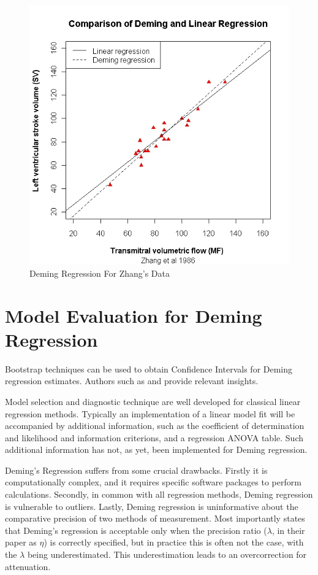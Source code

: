 \documentclass[12pt, a4paper]{report}
\theoremstyle{plain}
\theoremstyle{definition}
\theoremstyle{remark}
\begin{document}
\begin{figure}[h!]
	\includegraphics[width=130mm]{images/ZhangDeming.jpeg}
	\caption{Deming Regression For Zhang's Data}\label{ZhangDeming}
\end{figure}

\section{Model Evaluation for Deming Regression}
Bootstrap techniques can be used to obtain Confidence Intervals for Deming regression estimates. Authors such as 
\citet{carpenter2000bootstrap} and \citet{johnson2001bootstrap} provide relevant insights.




Model selection and diagnostic technique are well developed for classical linear regression methods. Typically an implementation of a linear model fit will be accompanied by additional information, such as the coefficient of determination and likelihood and information criterions, and a regression ANOVA table. Such additional information has not, as yet, been implemented for Deming regression.

Deming's Regression suffers from some crucial drawbacks. Firstly it is computationally complex, and it requires specific software packages to perform calculations. Secondly, in common with all regression methods, Deming regression is vulnerable to outliers. Lastly, Deming regression is uninformative
about the comparative precision of two methods of measurement. Most importantly \citet{CarollRupert} states that Deming's regression is acceptable only when the precision ratio ($\lambda$, in their paper as $\eta$) is correctly specified, but in practice this is often not the case, with the $\lambda$ being underestimated. This underestimation leads to an overcorrection for attenuation.
\end{document}
